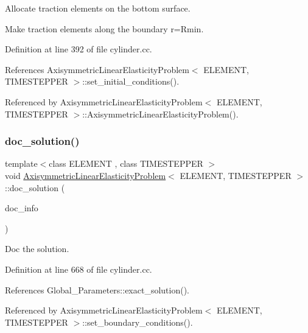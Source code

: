 Allocate traction elements on the bottom surface. 

Make traction elements along the boundary r=Rmin. 

Definition at line 392 of file cylinder.\+cc.



References Axisymmetric\+Linear\+Elasticity\+Problem$<$ E\+L\+E\+M\+E\+N\+T, T\+I\+M\+E\+S\+T\+E\+P\+P\+E\+R $>$\+::set\+\_\+initial\+\_\+conditions().



Referenced by Axisymmetric\+Linear\+Elasticity\+Problem$<$ E\+L\+E\+M\+E\+N\+T, T\+I\+M\+E\+S\+T\+E\+P\+P\+E\+R $>$\+::\+Axisymmetric\+Linear\+Elasticity\+Problem().

\mbox{\label{classAxisymmetricLinearElasticityProblem_a370b76b9e2902242de018339d3aedd04}} 
\subsubsection{\texorpdfstring{doc\+\_\+solution()}{doc\_solution()}}
{\footnotesize\ttfamily template$<$class E\+L\+E\+M\+E\+NT , class T\+I\+M\+E\+S\+T\+E\+P\+P\+ER $>$ \\
void \hyperlink{classAxisymmetricLinearElasticityProblem}{Axisymmetric\+Linear\+Elasticity\+Problem}$<$ E\+L\+E\+M\+E\+NT, T\+I\+M\+E\+S\+T\+E\+P\+P\+ER $>$\+::doc\+\_\+solution (\begin{DoxyParamCaption}\item[{Doc\+Info \&}]{doc\+\_\+info }\end{DoxyParamCaption})}



Doc the solution. 



Definition at line 668 of file cylinder.\+cc.



References Global\+\_\+\+Parameters\+::exact\+\_\+solution().



Referenced by Axisymmetric\+Linear\+Elasticity\+Problem$<$ E\+L\+E\+M\+E\+N\+T, T\+I\+M\+E\+S\+T\+E\+P\+P\+E\+R $>$\+::set\+\_\+boundary\+\_\+conditions().

